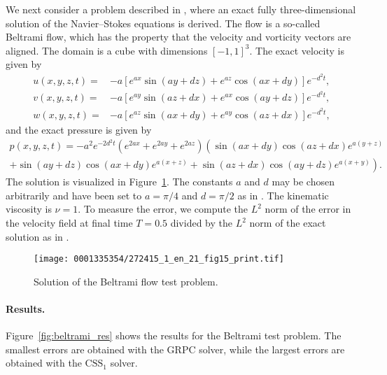 We next consider a problem described in \citet{EthierSteinmann1994},
where an exact fully three-dimensional solution of the Navier--Stokes
equations is derived. The flow is a so-called Beltrami flow, which has
the property that the velocity and vorticity vectors are aligned. The
domain is a cube with dimensions $[-1, 1]^3$. The exact velocity is
given by
\begin{equation}
  \begin{split}
    u(x,y,z,t) =& -a [ e^{a x} \sin(a y + d z)  + e^{az} \cos(a x + d y) ] e^{-d^{2}t}, \\
    v(x,y,z,t) =& -a [ e^{a y} \sin(a z + d x)  + e^{ax} \cos(a y + d z) ] e^{-d^{2}t}, \\
    w(x,y,z,t) =& -a [ e^{a z} \sin(a x + d y)  + e^{ay} \cos(a z + d x) ] e^{-d^{2}t},
  \end{split}
\end{equation}
and the exact pressure is given by
\begin{multline}
    p(x,y,z,t) = - a^2 e^{-2d^{2}t}
    \left(e^{2ax} + e^{2ay} + e^{2az}\right)
    \left(
    \sin(a x + d y) \cos(a z + d x) e^{a(y+z)} \right.
    \\
    \left. + \sin(a y + d z) \cos(a x + d y) e^{a(x+z)} +
    \sin(a z + d x) \cos(a y + d z) e^{a(x+y)}
    \right).
\end{multline}
The solution is visualized in Figure~\ref{fig:beltrami}. The constants
$a$ and $d$ may be chosen arbitrarily and have been set to $a=\pi/4$
and $d=\pi/2$ as in \citet{EthierSteinmann1994}. The kinematic
viscosity is $\nu = 1$. To measure the error, we compute the $L^2$
norm of the error in the velocity field at final time $T = 0.5$
divided by the $L^2$ norm of the exact solution as in
\citet{EthierSteinmann1994}.

\begin{figure}
\centering
\texttt{[image: 0001335354/272415\_1\_en\_21\_fig15\_print.tif]}
\caption{Solution of the Beltrami flow test problem.}
\label{fig:beltrami}\vspace*{6pt}
\end{figure}

\paragraph{Results.}

Figure~\ref{fig:beltrami_res} shows the results for the Beltrami test
problem. The smallest errors are obtained with the GRPC solver, while
the largest errors are obtained with the $\mathrm{CSS}_1$ solver.

